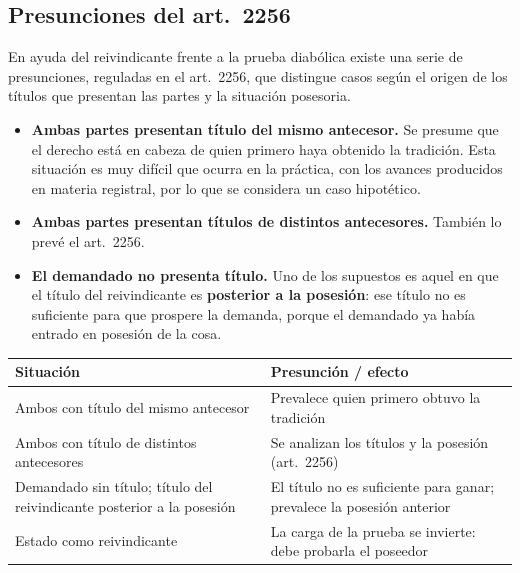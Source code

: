\documentclass[12pt,oneside]{book}
\begin{document}
\subsection{Presunciones del art.~2256}

En ayuda del reivindicante frente a la prueba diabólica existe una serie de presunciones, reguladas en el art.~2256, que distingue casos según el origen de los títulos que presentan las partes y la situación posesoria.

\begin{itemize}
    \item \textbf{Ambas partes presentan título del mismo antecesor.} Se presume que el derecho está en cabeza de quien primero haya obtenido la tradición. Esta situación es muy difícil que ocurra en la práctica, con los avances producidos en materia registral, por lo que se considera un caso hipotético.
    \item \textbf{Ambas partes presentan títulos de distintos antecesores.} También lo prevé el art.~2256.
    \item \textbf{El demandado no presenta título.} Uno de los supuestos es aquel en que el título del reivindicante es \textbf{posterior a la posesión}: ese título no es suficiente para que prospere la demanda, porque el demandado ya había entrado en posesión de la cosa.
\end{itemize}


\begin{table}[H]
\centering
\small
\begin{tabularx}{\textwidth}{@{}>{\raggedright\arraybackslash}X>{\raggedright\arraybackslash}X@{}}
\toprule
\textbf{Situación} & \textbf{Presunción / efecto} \\
\midrule
Ambos con título del mismo antecesor & Prevalece quien primero obtuvo la tradición \\
Ambos con título de distintos antecesores & Se analizan los títulos y la posesión (art.~2256) \\
Demandado sin título; título del reivindicante posterior a la posesión & El título no es suficiente para ganar; prevalece la posesión anterior \\
Estado como reivindicante & La carga de la prueba se invierte: debe probarla el poseedor \\
\bottomrule
\end{tabularx}
\end{table}
\end{document}
